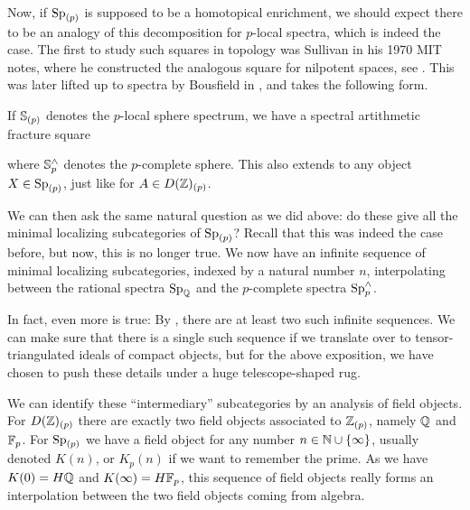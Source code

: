 Now, if $\sp_{(p)}$ is supposed to be a homotopical enrichment, we should expect there to be an analogy of this decomposition for $p$-local spectra, which is indeed the case. The first to study such squares in topology was Sullivan in his 1970 MIT notes, where he constructed the analogous square for nilpotent spaces, see \cite[3.20]{sullivan_05}. This was later lifted up to spectra by Bousfield in \cite[2.9]{bousfield_1979_localization}, and takes the following form. 

If $\S_{(p)}$ denotes the $p$-local sphere spectrum, we have a spectral artithmetic fracture square

\begin{center}
\end{center}

where $\S_p^\wedge$ denotes the $p$-complete sphere. This also extends to any object $X\in \sp_{(p)}$, just like for $A\in D(\Z)_{(p)}$. 

We can then ask the same natural question as we did above: do these give all the minimal localizing subcategories of $\sp_{(p)}$? Recall that this was indeed the case before, but now, this is no longer true. We now have an infinite sequence of minimal localizing subcategories, indexed by a natural number $n$, interpolating between the rational spectra $\sp_{\Q}$ and the $p$-complete spectra $\sp_p^\wedge$. 

\begin{remark}
    In fact, even more is true: By \cite{burklund-hahn-levy-schlank_23}, there are at least two such infinite sequences. We can make sure that there is a single such sequence if we translate over to tensor-triangulated ideals of compact objects, but for the above exposition, we have chosen to push these details under a huge telescope-shaped rug.
\end{remark}

We can identify these ``intermediary'' subcategories by an analysis of field objects. For $D(\Z)_{(p)}$ there are exactly two field objects associated to $\Z_{(p)}$, namely $\Q$ and $\F_p$. For $\Sp_{(p)}$ we have a field object for any number $n\in \N\cup \{\infty\}$, usually denoted $K(n)$, or $K_p(n)$ if we want to remember the prime. As we have $K(0)=H\Q$ and $K(\infty) = H\F_p$, this sequence of field objects really forms an interpolation between the two field objects coming from algebra. 

